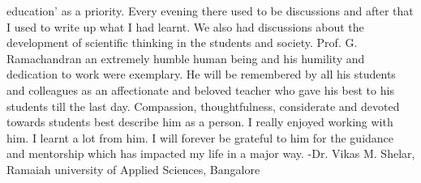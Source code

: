 education’ as a priority. Every evening there used to be discussions and after that I used to write up what I had learnt. We also had discussions about the development of scientific thinking in the students and society.
Prof. G. Ramachandran an extremely humble human being and his humility and dedication to work were exemplary. He will be remembered by all his students and colleagues as an affectionate and beloved teacher who gave his best to his students till the last day. Compassion, thoughtfulness, considerate and devoted towards students best describe him as a person. I really enjoyed working with him. I learnt a lot from him. I will forever be grateful to him for the guidance and mentorship which has impacted my life in a major way.
-Dr. Vikas M. Shelar, Ramaiah university of Applied Sciences, Bangalore
